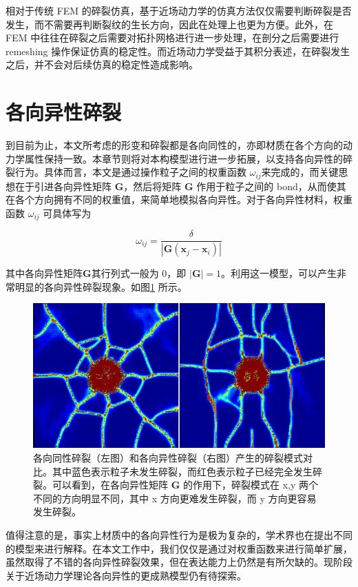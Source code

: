 相对于传统 FEM 的碎裂仿真，基于近场动力学的仿真方法仅仅需要判断碎裂是否发生，而不需要再判断裂纹的生长方向，因此在处理上也更为方便。此外，在 FEM 中往往在碎裂之后需要对拓扑网格进行进一步处理，在剖分之后需要进行 remeshing 操作保证仿真的稳定性。而近场动力学受益于其积分表述，在碎裂发生之后，并不会对后续仿真的稳定性造成影响。

\section{各向异性碎裂}
到目前为止，本文所考虑的形变和碎裂都是各向同性的，亦即材质在各个方向的动力学属性保持一致。本章节则将对本构模型进行进一步拓展，以支持各向异性的碎裂行为。具体而言，本文是通过操作粒子之间的权重函数 $\omega_{ij}$来完成的，而关键思想在于引进各向异性矩阵 $\mathbf{G}$，然后将矩阵 $\mathbf{G}$ 作用于粒子之间的 bond，从而使其在各个方向拥有不同的权重值，来简单地模拟各向异性。对于各向异性材料，权重函数 $\omega_{ij}$ 可具体写为

\begin{equation}
\omega_{ij}=\frac{\delta}{|\mathbf{G}(\mathbf{x}_j-\mathbf{x}_i)|}
\end{equation}

其中各向异性矩阵$\mathbf{G}$其行列式一般为 0，即 $|\mathbf{G}| = 1$。利用这一模型，可以产生非常明显的各向异性碎裂现象。如图\ref{demo_impact_color_map} 所示。

\begin{figure}[!htb]
  \centering
  \captionsetup{justification=centering}
  \includegraphics[width=0.6\linewidth]{chap/image/demo_impact_color_map}

  \caption{\label{demo_impact_color_map}
           各向同性碎裂（左图）和各向异性碎裂（右图）产生的碎裂模式对比。其中蓝色表示粒子未发生碎裂，而红色表示粒子已经完全发生碎裂。可以看到，在各向异性矩阵 $\mathbf{G}$ 的作用下，碎裂模式在 x,y 两个不同的方向明显不同，其中 x 方向更难发生碎裂，而 y 方向更容易发生碎裂。
          }
\end{figure}

值得注意的是，事实上材质中的各向异性行为是极为复杂的，学术界也在提出不同的模型来进行解释。在本文工作中，我们仅仅是通过对权重函数来进行简单扩展，虽然取得了不错的各向异性碎裂效果，但在表达能力上仍然是有所欠缺的。现阶段关于近场动力学理论各向异性的更成熟模型仍有待探索。

